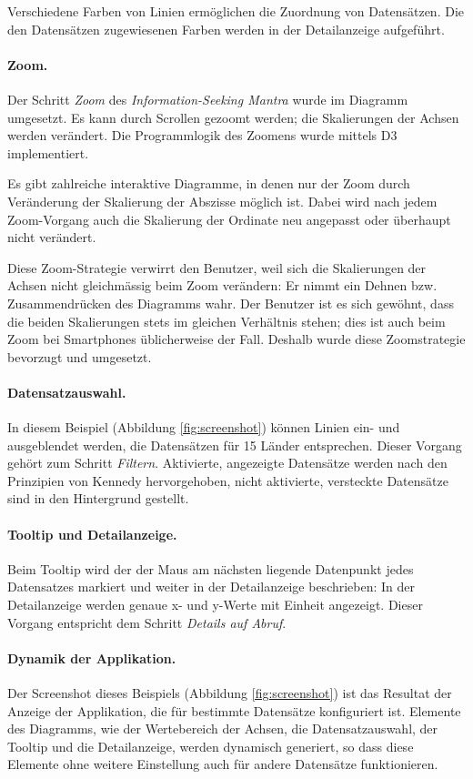 Verschiedene Farben von Linien ermöglichen die Zuordnung von Datensätzen. Die den Datensätzen zugewiesenen Farben werden in der Detailanzeige aufgeführt.

\paragraph{Zoom.} Der Schritt \textit{Zoom} des \textit{Information-Seeking Mantra} wurde im Diagramm umgesetzt. Es kann durch Scrollen gezoomt werden; die Skalierungen der Achsen werden verändert. Die Programmlogik des Zoomens wurde mittels D3 implementiert. 

Es gibt zahlreiche interaktive Diagramme, in denen nur der Zoom durch Veränderung der Skalierung der Abszisse möglich ist. Dabei wird nach jedem Zoom-Vorgang auch die Skalierung der Ordinate neu angepasst oder überhaupt nicht verändert.

Diese Zoom-Strategie verwirrt den Benutzer, weil sich die Skalierungen der Achsen nicht gleichmässig beim Zoom verändern: Er nimmt ein Dehnen bzw. Zusammendrücken des Diagramms wahr. Der Benutzer ist es sich gewöhnt, dass die beiden Skalierungen stets im gleichen Verhältnis stehen; dies ist auch beim Zoom bei Smartphones üblicherweise der Fall. Deshalb wurde diese Zoomstrategie bevorzugt und umgesetzt.

\paragraph{Datensatzauswahl.} In diesem Beispiel (Abbildung \ref{fig:screenshot}) können Linien ein- und ausgeblendet werden, die Datensätzen für 15 Länder entsprechen. Dieser Vorgang gehört zum Schritt \textit{Filtern}. Aktivierte, angezeigte Datensätze werden nach den Prinzipien von Kennedy \cite{pop} hervorgehoben, nicht aktivierte, versteckte Datensätze sind in den Hintergrund gestellt.

\paragraph{Tooltip und Detailanzeige.} Beim Tooltip wird der der Maus am nächsten liegende Datenpunkt jedes Datensatzes markiert und weiter in der Detailanzeige beschrieben: In der Detailanzeige werden genaue x- und y-Werte mit Einheit angezeigt. Dieser Vorgang entspricht dem Schritt \textit{Details auf Abruf}.

\paragraph{Dynamik der Applikation.} Der Screenshot dieses Beispiels (Abbildung \ref{fig:screenshot}) ist das Resultat der Anzeige der Applikation, die für bestimmte Datensätze konfiguriert ist. Elemente des Diagramms, wie der Wertebereich der Achsen, die Datensatzauswahl, der Tooltip und die Detailanzeige, werden dynamisch generiert, so dass diese Elemente ohne weitere Einstellung auch für andere Datensätze funktionieren.

